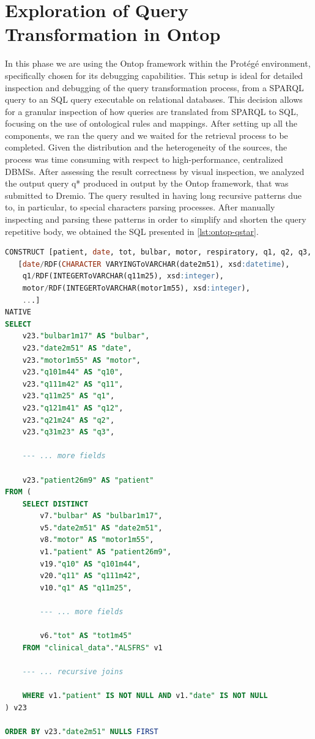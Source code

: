 \section{Exploration of Query Transformation in Ontop}
In this phase we are using the Ontop framework within the Protégé environment, specifically chosen for its debugging capabilities. This setup is ideal for detailed inspection and debugging of the query transformation process, from a SPARQL query to an SQL query executable on relational databases. This decision allows for a granular inspection of how queries are translated from SPARQL to SQL, focusing on the use of ontological rules and mappings. 
After setting up all the components, we ran the query and we waited for the retrieval process to be completed. Given the distribution and the heterogeneity of the sources, the process was time consuming with respect to high-performance, centralized \ac{DBMS}s. After assessing the result correctness by visual inspection, we analyzed the output query q* produced in output by the Ontop framework, that was submitted to Dremio.
The query resulted in having long recursive patterns due to, in particular, to special characters parsing processes.
After manually inspecting and parsing these patterns in order to simplify and shorten the query repetitive body, we obtained the \ac{SQL} presented in \ref{lst:ontop-qstar}.
\begin{lstlisting}[language=SQL, caption={Parsed SQL Translation of the Original SPARQL Query}, label={lst:views}]
CONSTRUCT [patient, date, tot, bulbar, motor, respiratory, q1, q2, q3, q4, q5, q6, q7, q8, q9, q10, q11, q12]
   [date/RDF(CHARACTER VARYINGToVARCHAR(date2m51), xsd:datetime),
    q1/RDF(INTEGERToVARCHAR(q11m25), xsd:integer),
    motor/RDF(INTEGERToVARCHAR(motor1m55), xsd:integer),
    ...]
NATIVE
SELECT
    v23."bulbar1m17" AS "bulbar",
    v23."date2m51" AS "date",
    v23."motor1m55" AS "motor",
    v23."q101m44" AS "q10",
    v23."q111m42" AS "q11",
    v23."q11m25" AS "q1",
    v23."q121m41" AS "q12",
    v23."q21m24" AS "q2",
    v23."q31m23" AS "q3",

    --- ... more fields

    v23."patient26m9" AS "patient"
FROM (
    SELECT DISTINCT
        v7."bulbar" AS "bulbar1m17",
        v5."date2m51" AS "date2m51",
        v8."motor" AS "motor1m55",
        v1."patient" AS "patient26m9",
        v19."q10" AS "q101m44",
        v20."q11" AS "q111m42",
        v10."q1" AS "q11m25",

        --- ... more fields
        
        v6."tot" AS "tot1m45"
    FROM "clinical_data"."ALSFRS" v1
    
    --- ... recursive joins

    WHERE v1."patient" IS NOT NULL AND v1."date" IS NOT NULL
) v23

ORDER BY v23."date2m51" NULLS FIRST
\end{lstlisting}
